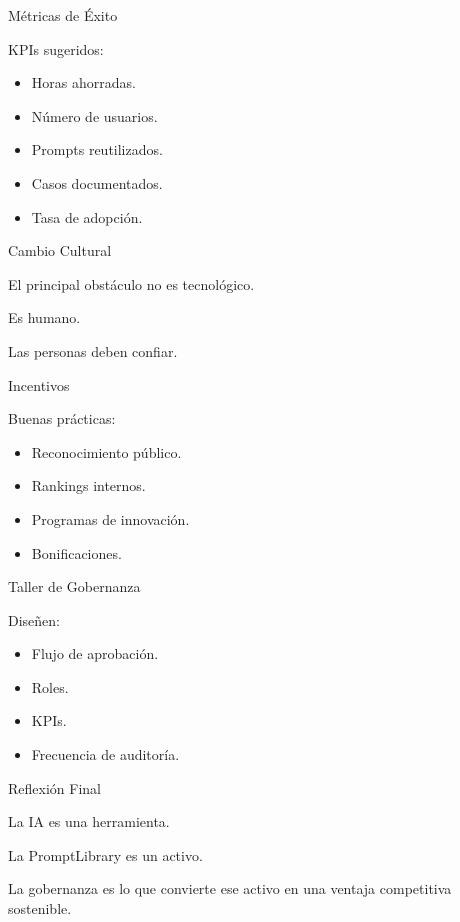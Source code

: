 \documentclass[aspectratio=169]{beamer}
\begin{document}
\begin{frame}{Métricas de Éxito}


KPIs sugeridos:

\begin{itemize}
  \item Horas ahorradas.
  \item Número de usuarios.
  \item Prompts reutilizados.
  \item Casos documentados.
  \item Tasa de adopción.
\end{itemize}
\end{frame}

\begin{frame}{Cambio Cultural}


El principal obstáculo no es tecnológico.

Es humano.

Las personas deben confiar.

\end{frame}

\begin{frame}{Incentivos}


Buenas prácticas:

\begin{itemize}
  \item Reconocimiento público.
  \item Rankings internos.
  \item Programas de innovación.
  \item Bonificaciones.
\end{itemize}
\end{frame}

\begin{frame}{Taller de Gobernanza}


Diseñen:

\begin{itemize}
  \item Flujo de aprobación.
  \item Roles.
  \item KPIs.
  \item Frecuencia de auditoría.
\end{itemize}
\end{frame}

\begin{frame}{Reflexión Final}


La IA es una herramienta.

La PromptLibrary es un activo.

La gobernanza es lo que convierte ese activo en una ventaja competitiva sostenible.

\end{frame}
\end{document}
